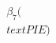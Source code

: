 \documentclass[preview]{standalone}
\begin{document}
\begin{align*}
\beta_7(\\text{PIE})
\end{align*}
\end{document}
